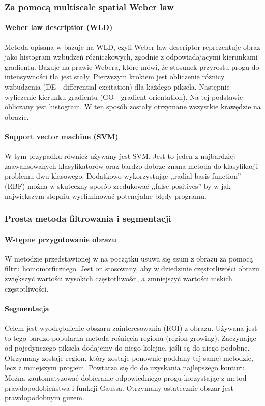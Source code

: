 \documentclass[11pt,openany]{sprawozdanie-agh}
\begin{document}
\subsubsection{Za pomocą multiscale spatial Weber law}
\paragraph{Weber law descriptior (WLD)\\}
Metoda opisana w \cite{Hussain2014} bazuje na WLD, czyli Weber law descriptor reprezentuje obraz jako histogram wzbudzeń różniczkowych, zgodnie z odpowiadającymi kierunkami gradientu. Bazuje na prawie Webera, które mówi, że stosunek przyrostu progu do intensywności tła jest stały. Pierwszym krokiem jest obliczenie różnicy wzbudzenia (DE - differential excitation) dla każdego piksela. Następnie wyliczenie kierunku gradientu (GO - gradient orientation). Na tej podstawie obliczany jest histogram. W ten sposób zostały otrzymane wszystkie krawędzie na obrazie.

\paragraph{Support vector machine (SVM)\\}
W tym przypadku również używany jest SVM. Jest to jeden z najbardziej zaawansowanych klasyfikatorów oraz bardzo dobrze znana metoda do klasyfikacji problemu dwu-klasowego. Dodatkowo wykorzystując ,,radial basis function'' (RBF) można w skuteczny sposób zredukować ,,false-positives'' by w jak największym stopniu wyeliminować potencjalne błędy programu.

\subsubsection{Prosta metoda filtrowania i segmentacji}
\paragraph{Wstępne przygotowanie obrazu\\}
W metodzie przedstawionej w \cite{Patel2014} na początku usuwa się szum z obrazu za pomocą filtru homomorficznego. Jest on stosowany, aby w dziedzinie częstotliwości obrazu zwiększyć wartości wysokich częstotliwości, a zmniejszyć wartości niskich częstotliwości.

\paragraph{Segmentacja\\}
Celem jest wyodrębnienie obszaru zainteresowania (ROI) z obrazu. Używana jest to tego bardzo popularna metoda rośnięcia regionu (region growing). Zaczynając od pojedynczego piksela dodajemy do niego kolejne, jeśli są do niego podobne. Otrzymany zostaje region, który zostaje ponownie poddany tej samej metodzie, lecz z mniejszym progiem. Powtarza się do do uzyskania najlepszego konturu. Można zautomatyzować dobieranie odpowiedniego progu korzystając z metod prawdopodobieństwa i funkcji Gaussa. Otrzymany ostatecznie obszar jest prawdopodobnym guzem.
\end{document}
